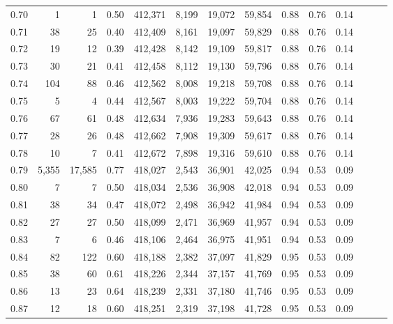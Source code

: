 \begin{tabular}{rrrrrrrrrrrrrr}
0.70 &       1 &       1 &  0.50 &  412,371 &    8,199 &  19,072 &  59,854 &  0.88 &  0.76 &      0.14 \\
0.71 &      38 &      25 &  0.40 &  412,409 &    8,161 &  19,097 &  59,829 &  0.88 &  0.76 &      0.14 \\
0.72 &      19 &      12 &  0.39 &  412,428 &    8,142 &  19,109 &  59,817 &  0.88 &  0.76 &      0.14 \\
0.73 &      30 &      21 &  0.41 &  412,458 &    8,112 &  19,130 &  59,796 &  0.88 &  0.76 &      0.14 \\
0.74 &     104 &      88 &  0.46 &  412,562 &    8,008 &  19,218 &  59,708 &  0.88 &  0.76 &      0.14 \\
0.75 &       5 &       4 &  0.44 &  412,567 &    8,003 &  19,222 &  59,704 &  0.88 &  0.76 &      0.14 \\
0.76 &      67 &      61 &  0.48 &  412,634 &    7,936 &  19,283 &  59,643 &  0.88 &  0.76 &      0.14 \\
0.77 &      28 &      26 &  0.48 &  412,662 &    7,908 &  19,309 &  59,617 &  0.88 &  0.76 &      0.14 \\
0.78 &      10 &       7 &  0.41 &  412,672 &    7,898 &  19,316 &  59,610 &  0.88 &  0.76 &      0.14 \\
0.79 &   5,355 &  17,585 &  0.77 &  418,027 &    2,543 &  36,901 &  42,025 &  0.94 &  0.53 &      0.09 \\
0.80 &       7 &       7 &  0.50 &  418,034 &    2,536 &  36,908 &  42,018 &  0.94 &  0.53 &      0.09 \\
0.81 &      38 &      34 &  0.47 &  418,072 &    2,498 &  36,942 &  41,984 &  0.94 &  0.53 &      0.09 \\
0.82 &      27 &      27 &  0.50 &  418,099 &    2,471 &  36,969 &  41,957 &  0.94 &  0.53 &      0.09 \\
0.83 &       7 &       6 &  0.46 &  418,106 &    2,464 &  36,975 &  41,951 &  0.94 &  0.53 &      0.09 \\
0.84 &      82 &     122 &  0.60 &  418,188 &    2,382 &  37,097 &  41,829 &  0.95 &  0.53 &      0.09 \\
0.85 &      38 &      60 &  0.61 &  418,226 &    2,344 &  37,157 &  41,769 &  0.95 &  0.53 &      0.09 \\
0.86 &      13 &      23 &  0.64 &  418,239 &    2,331 &  37,180 &  41,746 &  0.95 &  0.53 &      0.09 \\
0.87 &      12 &      18 &  0.60 &  418,251 &    2,319 &  37,198 &  41,728 &  0.95 &  0.53 &      0.09 \\

\end{tabular}
